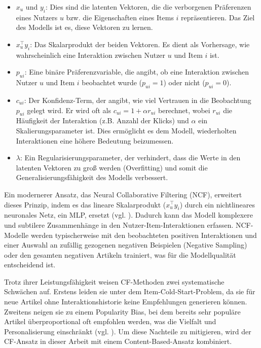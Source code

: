 \begin{itemize}
    \item $x_u$ und $y_i$: Dies sind die latenten Vektoren, die die verborgenen Präferenzen 
    eines Nutzers $u$ bzw. die Eigenschaften eines Items $i$ repräsentieren. Das Ziel des 
    Modells ist es, diese Vektoren zu lernen.
    \item $x_u^\top y_i$: Das Skalarprodukt der beiden Vektoren. Es dient als Vorhersage, 
    wie wahrscheinlich eine Interaktion zwischen Nutzer $u$ und Item $i$ ist.
    \item $p_{ui}$: Eine binäre Präferenzvariable, die angibt, ob eine Interaktion 
    zwischen Nutzer $u$ und Item $i$ beobachtet wurde ($p_{ui}=1$) oder nicht ($p_{ui}=0$).
    \item $c_{ui}$: Der Konfidenz-Term, der angibt, wie viel Vertrauen in die Beobachtung 
    $p_{ui}$ gelegt wird. Er wird oft als $c_{ui}=1+\alpha r_{ui}$ berechnet, wobei $r_{ui}$ 
    die Häufigkeit der Interaktion (z.B. Anzahl der Klicks) und $\alpha$ ein 
    Skalierungsparameter ist. Dies ermöglicht es dem Modell, wiederholten Interaktionen 
    eine höhere Bedeutung beizumessen.
    \item $\lambda$: Ein Regularisierungsparameter, der verhindert, dass die Werte in den 
    latenten Vektoren zu groß werden (Overfitting) und somit die Generalisierungsfähigkeit 
    des Modells verbessert.
\end{itemize}

Ein modernerer Ansatz, das Neural Collaborative Filtering (NCF), erweitert dieses 
Prinzip, indem es das lineare Skalarprodukt ($x_u^\top y_i$) durch ein nichtlineares 
neuronales Netz, ein \ac{MLP}, ersetzt (vgl. \cite{he_neural_2017}). 
Dadurch kann das Modell komplexere und subtilere Zusammenhänge in den 
Nutzer-Item-Interaktionen erfassen. NCF-Modelle werden typischerweise mit den 
beobachteten positiven Interaktionen und einer Auswahl an zufällig gezogenen 
negativen Beispielen (Negative Sampling) oder den gesamten negativen Artikeln trainiert, 
was für die Modellqualität entscheidend ist.

Trotz ihrer Leistungsfähigkeit weisen CF-Methoden zwei systematische Schwächen auf. 
Erstens leiden sie unter dem Item-Cold-Start-Problem, da sie für neue Artikel ohne 
Interaktionshistorie keine Empfehlungen generieren können. Zweitens neigen sie zu 
einem Popularity Bias, bei dem bereits sehr populäre Artikel überproportional oft 
empfohlen werden, was die Vielfalt und Personalisierung einschränkt 
(vgl. \cite{Abdollahpouri_Popularity_Bias_2019}). Um diese Nachteile zu mitigieren, 
wird der CF-Ansatz in dieser Arbeit mit einem Content-Based-Ansatz kombiniert.

